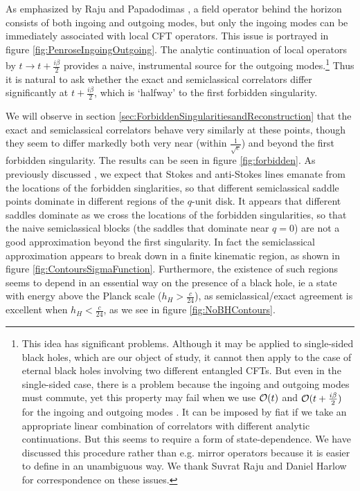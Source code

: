 \documentclass[12pt]{article}
\numberwithin{equation}{section}
\newcommand{\CO}{{\cal O}}
\begin{document}
As emphasized by Raju and Papadodimas \cite{Papadodimas:2012aq, Papadodimas:2013jku}, a field operator behind the horizon consists of both ingoing and outgoing modes, but only the ingoing modes can be immediately associated with local CFT operators.  This issue is portrayed in figure \ref{fig:PenroseIngoingOutgoing}.  The analytic continuation of local operators by $t \to t + \frac{i \beta}{2}$ provides a naive, instrumental source for the outgoing modes.\footnote{This idea has significant problems.  Although it may be applied to single-sided black holes, which are our object of study, it cannot then apply to the case of eternal black holes involving two different entangled CFTs.  But even in the single-sided case, there is a problem because the ingoing and outgoing modes must commute, yet this property may fail when we use $\CO(t)$ and $\CO(t + \frac{i \beta}{2})$ for the ingoing and outgoing modes \cite{Papadodimas:2012aq, Almheiri:2013hfa}.  It can be imposed by fiat if we take an appropriate linear combination of correlators with different analytic continuations. But this seems to require a form of state-dependence.  We have discussed this procedure rather than e.g. mirror operators \cite{Papadodimas:2012aq, Papadodimas:2013jku} because it is easier to define in an unambiguous way.  We thank Suvrat Raju and Daniel Harlow for correspondence on these issues.}  Thus it is natural to ask whether the exact and semiclassical correlators differ significantly at $t + \frac{i \beta}{2}$, which is `halfway' to the first forbidden singularity.  

We will observe in section \ref{sec:ForbiddenSingularitiesandReconstruction} that the exact and semiclassical correlators behave very similarly at these points, though they seem to differ markedly both very near (within $\frac{1}{\sqrt{c}}$) and beyond the first forbidden singularity.  The results can be seen in figure \ref{fig:forbidden}.  As previously discussed \cite{Fitzpatrick:2016ive}, we expect that Stokes and anti-Stokes lines emanate from the locations of the forbidden singlarities, so that different semiclassical saddle points dominate in different regions of the $q$-unit disk.  
It appears that different saddles dominate as we cross the locations of the forbidden singularities, so that the naive semiclassical blocks (the saddles that dominate near $q = 0$) are not a good approximation beyond the first singularity.  In fact the semiclassical approximation appears to break down in a finite kinematic region, as shown in figure \ref{fig:ContoursSigmaFunction}.  Furthermore, the existence of such regions seems to depend in an essential way on the presence of a black hole, ie a state with energy above the Planck scale ($h_H > \frac{c}{24}$), as semiclassical/exact agreement is excellent when $h_H < \frac{c}{24}$, as we see in figure \ref{fig:NoBHContours}.
\end{document}
